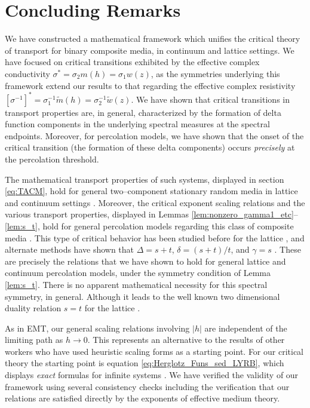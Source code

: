 \documentclass[english,12pt,jmp,graphicx]{revtex4-1}
\begin{document}
\section{Concluding Remarks}
%
We have constructed a mathematical framework which unifies the critical
theory of transport for binary composite media, in continuum and
lattice settings. We have focused on critical transitions exhibited by
the effective complex conductivity $\sigma^*=\sigma_2m(h)=\sigma_1w(z)$, as the
symmetries underlying this framework extend our results to that
regarding the effective complex resistivity
$[\sigma^{-1}]^*=\sigma_1^{-1}\tilde{m}(h)=\sigma_2^{-1}\tilde{w}(z)$. We have
shown that critical transitions in transport properties are, in
general, characterized by the formation of delta function components
in the underlying spectral measures at the spectral
endpoints. Moreover, for percolation models, we have shown that the
onset of the critical transition (the formation of these delta
components) occurs \emph{precisely} at the percolation threshold.       

The mathematical transport properties of such systems, displayed in
section \ref{eq:TACM}, hold for general two--component stationary
random media in lattice and continuum settings
\cite{Golden:CMP-473}. Moreover, the critical exponent scaling
relations and the various transport properties, displayed in Lemmas
\ref{lem:nonzero_gamma1_etc}--\ref{lem:s_t}, hold for general
percolation models regarding this class of composite media
\cite{Golden:PRL-3935}. This  type of critical behavior has been
studied before for the lattice 
\cite{Efros:PSSB-303,Clerc:AP-191,Bergman:SSP-147}, and alternate 
methods have shown that $\Delta=s+t$, $\delta=(s+t)/t$, and $\gamma=s$
\cite{Golden:PRL-3935}. These are precisely the relations that we have 
shown to hold for general lattice and continuum percolation models,
under the symmetry condition of Lemma \ref{lem:s_t}. There is no
apparent mathematical necessity for this spectral symmetry, in
general. Although it leads to the well known two dimensional duality
relation $s=t$ for the lattice
\cite{Bergman:SSP-147,Clerc:AP-191,Efros:PSSB-303}. 

As in EMT, our general scaling relations involving $|h|$ are
independent of the limiting path as $h\to0$. This represents an alternative to the
results of other workers
\cite{Efros:PSSB-303,Clerc:AP-191,Bergman:SSP-147} who have used heuristic
scaling forms as a starting point. For our critical
theory the starting point is equation \eqref{eq:Herglotz_Funs_sed_LYRB}, which displays
\emph{exact} formulas for infinite systems \cite{Golden:PRL-3935}. We
have verified the validity of our framework using several consistency
checks including the verification that our relations are satisfied directly
by the exponents of effective medium theory.
\end{document}
